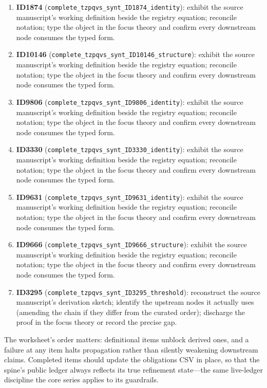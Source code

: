 \documentclass[11pt]{article}
\theoremstyle{remark}
\begin{document}
\begin{enumerate}
\item \textbf{ID1874} (\texttt{complete\_tzpqvs\_synt\_ID1874\_identity}): exhibit the source manuscript's working definition beside the registry equation; reconcile notation; type the object in the focus theory and confirm every downstream node consumes the typed form.
\item \textbf{ID10146} (\texttt{complete\_tzpqvs\_synt\_ID10146\_structure}): exhibit the source manuscript's working definition beside the registry equation; reconcile notation; type the object in the focus theory and confirm every downstream node consumes the typed form.
\item \textbf{ID9806} (\texttt{complete\_tzpqvs\_synt\_ID9806\_identity}): exhibit the source manuscript's working definition beside the registry equation; reconcile notation; type the object in the focus theory and confirm every downstream node consumes the typed form.
\item \textbf{ID3330} (\texttt{complete\_tzpqvs\_synt\_ID3330\_identity}): exhibit the source manuscript's working definition beside the registry equation; reconcile notation; type the object in the focus theory and confirm every downstream node consumes the typed form.
\item \textbf{ID9631} (\texttt{complete\_tzpqvs\_synt\_ID9631\_identity}): exhibit the source manuscript's working definition beside the registry equation; reconcile notation; type the object in the focus theory and confirm every downstream node consumes the typed form.
\item \textbf{ID9666} (\texttt{complete\_tzpqvs\_synt\_ID9666\_structure}): exhibit the source manuscript's working definition beside the registry equation; reconcile notation; type the object in the focus theory and confirm every downstream node consumes the typed form.
\item \textbf{ID3295} (\texttt{complete\_tzpqvs\_synt\_ID3295\_threshold}): reconstruct the source manuscript's derivation sketch; identify the upstream nodes it actually uses (amending the chain if they differ from the curated order); discharge the proof in the focus theory or record the precise gap.
\end{enumerate}

The worksheet's order matters: definitional items unblock derived ones, and a failure at any item halts propagation rather than silently weakening downstream claims. Completed items should update the obligations CSV in place, so that the spine's public ledger always reflects its true refinement state---the same live-ledger discipline the core series applies to its guardrails.
\end{document}
